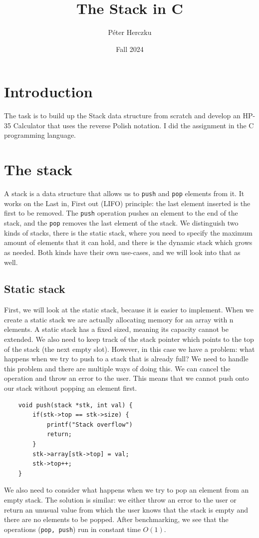 \documentclass[a4paper,11pt]{article}
\begin{document}
    \title{
        \textbf{The Stack in C}
    }
    \author{Péter Herczku}
    \date{Fall 2024}

    \maketitle

    \section*{Introduction}

    The task is to build up the Stack data structure from scratch and develop an HP-35 Calculator that uses the reverse Polish notation.
    I did the assignment in the C programming language.

    \section*{The stack}

    A stack is a data structure that allows us to {\tt push} and {\tt pop} elements from it.
    It works on the Last in, First out (LIFO) principle: the last element inserted is the first to be removed.
    The {\tt push} operation pushes an element to the end of the stack, and the {\tt pop} removes the last element of the stack.
    We distinguish two kinds of stacks, there is the static stack, where you need to specify the maximum amount of elements that it can hold, and there is the dynamic stack which grows as needed.
    Both kinds have their own use-cases, and we will look into that as well.

    \subsection*{Static stack}

    First, we will look at the static stack, because it is easier to implement.
    When we create a static stack we are actually allocating memory for an array with n elements.
    A static stack has a fixed sized, meaning its capacity cannot be extended.
    We also need to keep track of the stack pointer which points to the top of the stack (the next empty slot).
    However, in this case we have a problem: what happens when we try to push to a stack that is already full?
    We need to handle this problem and there are multiple ways of doing this.
    We can cancel the operation and throw an error to the user.
    This means that we cannot push onto our stack without popping an element first.
    \begin{verbatim}
    void push(stack *stk, int val) {
        if(stk->top == stk->size) {
            printf("Stack overflow")
            return;
        }
        stk->array[stk->top] = val;
        stk->top++;
    }
    \end{verbatim}
    We also need to consider what happens when we try to pop an element from an empty stack.
    The solution is similar: we either throw an error to the user or return an unusual value from which the user knows that the stack is empty and there are no elements to be popped.
    After benchmarking, we see that the operations ({\tt pop, push}) run in constant time $O(1)$.
\end{document}
